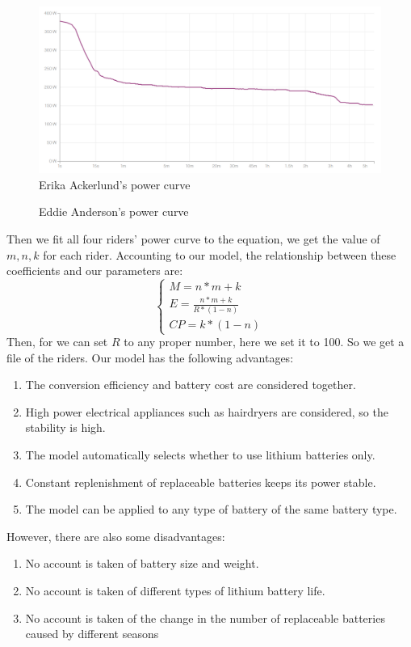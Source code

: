 \documentclass[12pt]{article}
\begin{document}
\begin{figure}
    \centering
    \includegraphics[width=1\columnwidth]{eackerlund}
    \caption{Erika Ackerlund's power curve}
\end{figure}
\begin{figure}
    \centering
    
    \caption{Eddie Anderson's power curve}
\end{figure}
Then we fit all four riders' power curve to the equation, we get the value of $m,n,k$ for each rider. Accounting to our model, the relationship between these coefficients
and our parameters are:
\begin{equation}
    \left\{
    \begin{array}{c}
        M=n*m+k                 \\
        E=\frac{n*m+k}{R*(1-n)} \\
        CP=k*(1-n)
    \end{array}
    \right.
\end{equation}
Then, for we can set $R$ to any proper number, here we set it to 100. So we get a file of the riders.%
Our model has the following advantages:
\begin{enumerate}
    \item The conversion efficiency and battery cost are considered together.
    \item High power electrical appliances such as hairdryers are considered, so the stability is high.
    \item The model automatically selects whether to use lithium batteries only.
    \item Constant replenishment of replaceable batteries keeps its power stable.
    \item The model can be applied to any type of battery of the same battery type.
\end{enumerate}
However, there are also some disadvantages:
\begin{enumerate}
    \item No account is taken of battery size and weight.
    \item No account is taken of different types of lithium battery life.
    \item No account is taken of the change in the number of replaceable batteries caused by different seasons
\end{enumerate}
\end{document}
